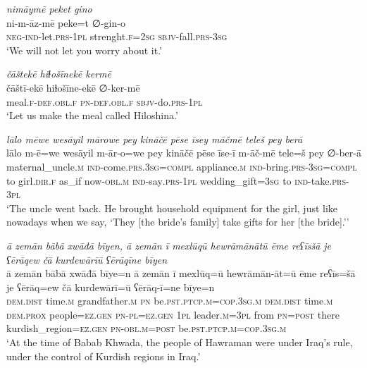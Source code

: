 \ea \label{ŽP.235}
\textit{nimāymē peket gino} \\ 
\gll ni-m-āz-mē peke=t ∅-gin-o \\ 
 \textsc{neg-}\textsc{ind-}let\textsc{.prs}\textsc{-1pl} strenght\textsc{.f}\textsc{=\textsc{2sg}} \textsc{sbjv-}fall\textsc{.prs}\textsc{-3sg} \\ 
\glt `We will not let you worry about it.'
\z 
 
\ea \label{ŽP.241}
\textit{čāštekē hiɫošīnekē kermē} \\ 
\gll čāštī-ekē hiɫošīne-ekē ∅-ker-mē \\ 
 meal\textsc{.f}\textsc{-def}\textsc{.obl}\textsc{.f} \textsc{pn}\textsc{-def}\textsc{.obl}\textsc{.f} \textsc{sbjv-}do\textsc{.prs}\textsc{-1pl} \\ 
\glt `Let us make the meal called Hiloshina.'
\z 
 
\ea \label{ŽP.264}
\textit{lālo mēwe wesāyil mārowe pey kināčē pēse īsey māčmē teleš pey berā} \\ 
\gll lālo m-ē=we wesāyil m-ār-o=we pey kināčē pēse īse-ī m-āč-mē tele=š pey ∅-ber-ā \\ 
 maternal\_uncle\textsc{.m} \textsc{ind-}come\textsc{.prs}\textsc{.3sg}\textsc{=compl} appliance\textsc{.m} \textsc{ind-}bring\textsc{.prs}\textsc{-3sg}\textsc{=compl} to girl\textsc{.dir}\textsc{.f} as\_if now\textsc{-obl}\textsc{.m} \textsc{ind-}say\textsc{.prs}\textsc{-1pl} wedding\_gift\textsc{=3sg} to \textsc{ind-}take\textsc{.prs}\textsc{-3pl} \\ 
\glt `The uncle went back. He brought household equipment for the girl, just like nowadays when we say, ‘They [the bride’s family] take gifts for her [the bride].’'
\z 
 
\ea \label{BP.9}
\textit{ā zemān bābā xwāđā bīyen, ā zemān ī mexlūqū hewrāmānātū ēme reʕīsšā je ʕērāqew čā kurdewārīū ʕērāqīne bīyen} \\ 
\gll ā zemān bābā xwāđā bīye=n ā zemān ī mexlūq=ū hewrāmān-āt=ū ēme reʕīs=šā je ʕērāq=ew čā kurdewārī=ū ʕērāq-ī=ne bīye=n \\ 
 \textsc{dem.dist} time\textsc{.m} grandfather\textsc{.m} \textsc{pn} be\textsc{.pst}\textsc{.ptcp}\textsc{.m}\textsc{=cop}\textsc{.3sg}\textsc{.m} \textsc{dem.dist} time\textsc{.m} \textsc{dem.prox} people\textsc{=ez.gen} \textsc{pn}\textsc{\textsc{-pl}}\textsc{=ez.gen} \textsc{1pl} leader\textsc{.m}\textsc{=3pl} from \textsc{pn}\textsc{=\textsc{post}} there kurdish\_region\textsc{=ez.gen} \textsc{pn}\textsc{-obl}\textsc{.m}\textsc{=\textsc{post}} be\textsc{.pst}\textsc{.ptcp}\textsc{.m}\textsc{=cop}\textsc{.3sg}\textsc{.m} \\ 
\glt `At the time of Babab Khwada, the people of Hawraman were under Iraq’s rule, under the control of Kurdish regions in Iraq.'
\z 
 
